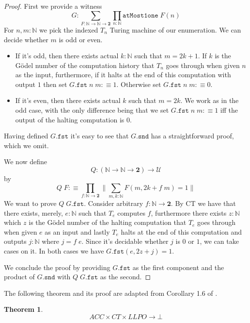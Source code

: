 \documentclass[12pt]{report}
\newtheorem{thm}{Theorem}[chapter]
\theoremstyle{definition}
\begin{document}
\begin{proof}
First we provide a witness
$$G : \sum_{F : \mathbb{N} \rightarrow \mathbb{N} \rightarrow \mathbf{2} } \prod_{n : \mathbb{N}}\mathtt{atMost1one}\; F(n)$$
For $n, m : \mathbb{N}$ we pick the indexed $T_n$ Turing machine of our enumeration. 
We can decide whether $m$ is odd or even. 
\begin{itemize}
\item If it's odd, then there exists actual $k : \mathbb{N}$ such that $m = 2k +1$. 
If $k$ is the G\"odel number of the computation history that $T_n$ goes through when given $n$ as the input, furthermore, if it halts at the end of this computation with output $1$ then set $G.\mathtt{fst}\; n\; m :\equiv 1$. 
Otherwise set $G.\mathtt{fst}\; n\; m :\equiv 0$.
\item If it's even, then there exists actual $k$ such that $m = 2k$. 
We work as in the odd case, with the only difference being that we set $G.\mathtt{fst}\; n\; m :\equiv 1$ iff the output of the halting computation is $0$.
\end{itemize}
Having defined $G.\mathtt{fst}$ it's easy to see that $G.\mathtt{snd}$ has a straightforward proof, which we omit. 

We now define 
$$Q : (\mathbb{N} \rightarrow \mathbb{N} \rightarrow \mathbf{2}) \rightarrow \mathcal{U}$$ 
by 
$$Q\; F :\equiv \prod_{f : \mathbb{N} \rightarrow \mathbf{2}} \big\lVert \sum_{m, k : \mathbb{N}} F(m, 2k+ f\; m) = 1 \big\rVert$$
We want to prove $Q\; G.\mathtt{fst}$. 
Consider arbitrary $f : \mathbb{N} \rightarrow \mathbf{2}$. 
By CT we have that there exists, merely, $e : \mathbb{N}$ such that $T_e$ computes $f$, furthermore there exists $z : \mathbb{N}$ which $z$ is the G\"odel number of the halting computation that $T_e$ goes through when given $e$ as an input and lastly $T_e$ halts at the end of this computation and outputs $j : \mathbb{N}$ where $j = f\; e$. 
Since it's decidable whether $j$ is $0$ or $1$, we can take cases on it.
In both cases we have $G.\mathtt{fst} (e, 2z + j) = 1$. 

We conclude the proof by providing $G.\mathtt{fst}$ as the first component and the product of $G.\mathtt{snd}$ with $Q\; G.\mathtt{fst}$ as the second.
\end{proof}
The following theorem and its proof are adapted from Corollary 1.6 of \cite{bridges_richman_1987_1}. 
\begin{thm}\label{ACCandCTandLLPOimplyBottom}
$$ACC \times CT \times LLPO \rightarrow \bot$$
\end{thm}
\end{document}
